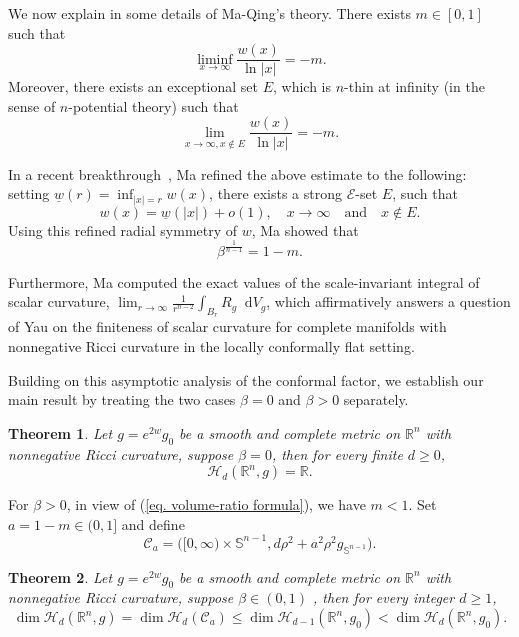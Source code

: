 \documentclass[12pt]{amsart}
\theoremstyle{plain}
\newtheorem{theoremx}{Theorem}
\theoremstyle{definition}
\theoremstyle{remark}     %
\numberwithin{equation}{section}
\newcommand{\R}{\mathbb{R}}
\newcommand{\dd}{\mathop{}\!\mathrm{d}}%
\begin{document}
We now explain in some details of Ma-Qing's theory. There exists $m\in [0,1]$ such that 
\[
    \liminf_{x\to \infty} \frac{w(x)}{\ln |x|}=-m.
\]
Moreover, there exists an exceptional set $E$, which is $n$-thin at infinity (in the sense of $n$-potential theory) such that 
\[
\lim_{x\to \infty, x\notin E} \frac{w(x)}{\ln |x|}=-m.
\]

In a recent breakthrough~\cite{M}, Ma refined the above estimate to the following: setting $\underline{w}(r)=\inf_{|x|=r} w(x)$, there exists a strong  $\mathcal{E}$-set $E$, such that 
\begin{equation} \label{eq:asympradial}
w(x)=\underline{w}(|x|)+o(1), \quad x\to \infty \quad \text{and} \quad x\notin E.
\end{equation}
Using this refined radial symmetry of $w$, Ma \cite{M} showed that 
\begin{equation}\label{eq. volume-ratio formula}
    \beta^{\frac{1}{n-1}}=1-m.
\end{equation}

Furthermore, Ma computed the exact values of the scale-invariant integral of scalar curvature, $\lim_{r\to \infty} \frac{1}{r^{n-2}}\int_{B_r} R_g \dd V_g$, which affirmatively answers a question of Yau on the finiteness of scalar curvature for complete manifolds with nonnegative Ricci curvature in the locally conformally flat setting.

Building on this asymptotic analysis of the conformal factor, we establish our main result by treating the two cases $\beta=0$ and $\beta>0$ separately.

\begin{theoremx} \label{thm: T1}
    Let $g=e^{2w}g_{0}$ be a smooth and complete metric on $\mathbb{R}^n$ with nonnegative Ricci curvature, suppose $\beta=0$, then for every finite $d\ge0$,
\[
 \mathcal{H}_d(\R^n,g)=\R.
\]
\end{theoremx}


{For $\beta>0$, in view of (\ref{eq. volume-ratio formula}), we have $m<1$. Set $a=1-m\in (0,1]$ and define 
\[
\mathcal{C}_a=
    \bigl([0,\infty)\times\mathbb S^{n-1},
    d\rho^2+a^2\rho^2g_{\mathbb S^{n-1}}\bigr).
\]}
\begin{theoremx} \label{thm:T2}
        Let $g=e^{2w}g_{0}$ be a smooth and complete metric on $\mathbb{R}^n$ with nonnegative Ricci curvature, suppose $\beta\in (0,1)$ , then for every integer $d\ge1$,
\[
 \dim \mathcal{H}_d(\R^n,g)=\dim \mathcal{H}_d(\mathcal{C}_a) \leq \dim \mathcal{H}_{d-1}(\mathbb{R}^n, g_0)<\dim \mathcal{H}_{d}(\mathbb{R}^n, g_0).
\]
\end{theoremx}
\end{document}
